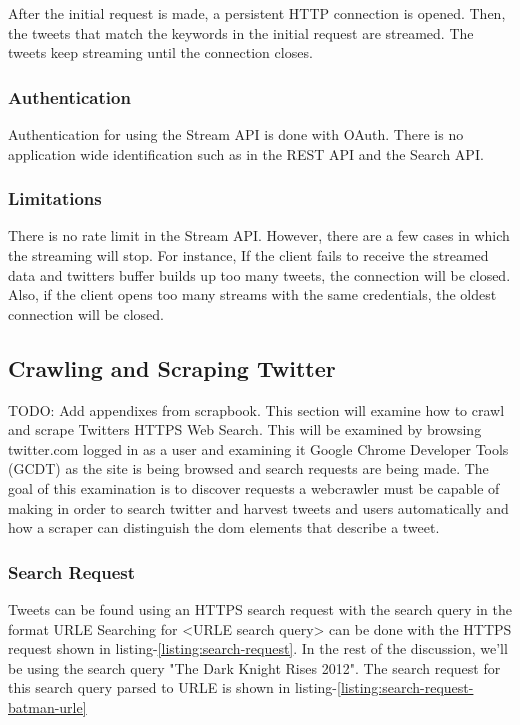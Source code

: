 After the initial request is made, a persistent HTTP connection is opened. Then, the tweets that match the keywords in the initial request are streamed. The tweets keep streaming until the connection closes.

\subsubsection{Authentication}
Authentication for using the Stream API is done with OAuth. There is no application wide identification such as in the REST API and the Search API.

\subsubsection{Limitations}
There is no rate limit in the Stream API. However, there are a few cases in which the streaming will stop. For instance, If the client fails to receive the streamed data and twitters buffer builds up too many tweets, the connection will be closed. Also, if the client opens too many streams with the same credentials, the oldest connection will be closed.

\subsection{Crawling and Scraping Twitter}
TODO: Add appendixes from scrapbook.
This section will examine how to crawl and scrape Twitters HTTPS Web Search. This will be examined by browsing twitter.com logged in as a user and examining it Google Chrome Developer Tools (GCDT)\cite{gcdt} as the site is being browsed and search requests are being made. The goal of this examination is to discover requests a webcrawler must be capable of making in order to search twitter and harvest tweets and users automatically and how a scraper can distinguish the dom elements that describe a tweet.


\subsubsection{Search Request}
Tweets can be found using an HTTPS search request with the search query in the format URLE \cite{w3-urle-ref}
Searching for <URLE search query> can be done with the HTTPS request shown in listing-\ref{listing:search-request}.
In the rest of the discussion, we'll be using the search query "The Dark Knight Rises 2012". The search request for this search query parsed to URLE is shown in listing-\ref{listing:search-request-batman-urle}


